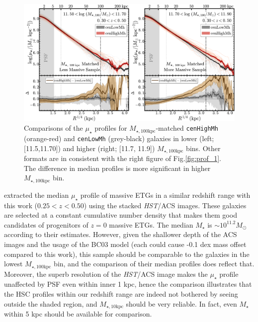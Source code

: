 \documentclass{emulateapj}
\def\rbcg{\texttt{cenHighMh}}
\def\nbcg{\texttt{cenLowMh}}
\def\mstar{{$M_{\star}$}}
\def\minn{{$M_{\star,10\mathrm{kpc}}$}}
\def\mtot{{$M_{\star,100\mathrm{kpc}}$}}
\def\mden{{$\mu_{\star}$}}
\begin{document}
\begin{CJK*}{UTF8}{gbsn}
  \begin{figure}[t]
      \centering 
      \includegraphics[width=\textwidth]{fig/redbcg_prof_2}
      \caption{Comparisons of the \mden{} profiles for \mtot{}-matched \rbcg{} 
          (orange-red) and \nbcg{} (grey-black) galaxies in lower (left; [11.5,11.70]) 
          and higher (right; [11.7, 11.9]) \mtot{} bins. 
          Other formats are in consistent with the right figure of Fig.\ref{fig:prof_1}.
          The difference in median profiles is more significant in higher \mtot{} bin.}
      \label{fig:prof_2}
  \end{figure}

    \citet{Patel2013} extracted the median \mden{} profile of massive ETGs in a similar 
    redshift range with this work ($0.25 < z < 0.50$) using the stacked \textit{HST}/ACS
    images. 
    These galaxies are selected at a constant cumulative number density that makes them  
    good candidates of progenitors of $z=0$ massive ETGs.  
    The median \mstar{} is $\sim 10^{11.2} M_{\odot}$ according to their estimates.  
    However, given the shallower depth of the ACS images and the usage of the BC03 model 
    (each could cause -0.1 dex mass offset compared to this work), this sample should be 
    comparable to the galaxies in the lowest \mtot{} bin, and the comparison of their 
    median profiles does reflect that.  
    Moreover, the superb resolution of the \textit{HST}/ACS image makes the \mden{} 
    profile unaffected by PSF even within inner 1 kpc, hence the comparison illustrates 
    that the HSC profiles within our redshift range are indeed not bothered by 
    seeing outside the shaded region, and \minn{} should be very reliable.
    In fact, even \mstar{} within 5 kpc should be available for comparison.  
  

\end{CJK*}
\end{document}
